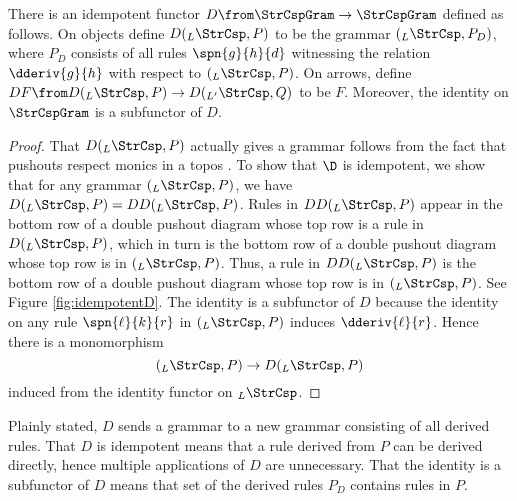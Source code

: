 

  \begin{lemma}
    There is an idempotent functor
    $ D \from \StrCspGram \to \StrCspGram $ defined as
    follows. On objects define $ D ( _{L}\StrCsp , P ) $ to be
    the grammar $ ( _{L} \StrCsp , P_D) $, where $ P_D $
    consists of all rules $ \spn{g}{h}{d} $ witnessing the
    relation $ \dderiv{g}{h} $ with respect to
    $ ( _{L}\StrCsp , P ) $. On arrows, define
    $ DF \from D( _{L}\StrCsp , P ) \to D( _{L'}\StrCsp , Q )
    $ to be $ F $.  Moreover, the identity on $ \StrCspGram $
    is a subfunctor of $ D $.
  \end{lemma}
  \begin{proof}
    That $ D ( _{L}\StrCsp , P ) $ actually gives a grammar
    follows from the fact that pushouts respect monics in a
    topos \cite[Lem.~12]{LackSobo_Adhesive}.
    To show that $ \D $ is idempotent, we show that for any
    grammar $ ( _{L}\StrCsp , P ) $, we have
    $ D ( _{L}\StrCsp , P ) = DD ( _{L}\StrCsp , P ) $.  Rules
    in $ DD ( _{L}\StrCsp , P ) $ appear in the bottom row of a
    double pushout diagram whose top row is a rule in
    $ D ( _{L}\StrCsp , P ) $, which in turn is the bottom row
    of a double pushout diagram whose top row is in
    $ ( _{L}\StrCsp , P ) $. Thus, a rule in
    $ DD ( _{L}\StrCsp , P ) $ is the bottom row of a double
    pushout diagram whose top row is in
    $ ( _{L}\StrCsp , P ) $. See Figure \ref{fig:idempotentD}.
%
    The identity is a subfunctor of $ D $ because the identity
    on any rule $ \spn{\ell}{k}{r} $ in
    $ ( _{L}\StrCsp , P ) $ induces $ \dderiv{\ell}{r} $.
    Hence there is a monomorphism
    \[
      ( _L \StrCsp , P ) \to
      D ( _L \StrCsp , P )
    \]
    induced from the identity functor on $ _L\StrCsp $.
  \end{proof}
%
  Plainly stated, $ D $ sends a grammar to a new grammar
  consisting of all derived rules.  That $ D $ is idempotent
  means that a rule derived from $ P $ can be derived
  directly, hence multiple applications of $ D $ are
  unnecessary.  That the identity is a subfunctor of $ D $
  means that set of the derived rules $ P_D $ contains rules
  in $ P $.




